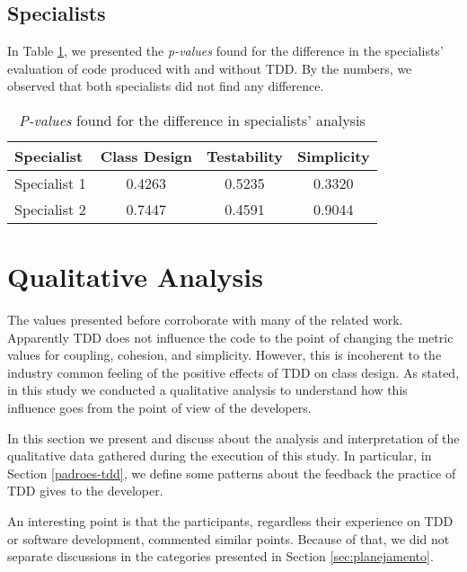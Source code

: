 \documentclass[times]{speauth}
\begin{document}
\subsection{Specialists}

In Table
\ref{tab:especialistas-industria}, we presented the \textit{p-values} found for the
difference in the specialists' evaluation of code produced with and without TDD.
By the numbers, we observed that both specialists did not find any difference.

\begin{table}[h!]
	\centering
	\begin{tabular}{| p{2cm} | c | c | c | }
		\hline
		\textbf{Specialist} & \textbf{Class Design} & \textbf{Testability} & \textbf{Simplicity}\\
		\hline
		Specialist 1 &	0.4263 &	0.5235 &	0.3320\\
		Specialist 2 &	0.7447 &	0.4591 &	0.9044\\
		\hline
	\end{tabular}
	\caption{\textit{P-values} found for the difference in specialists' analysis}
	\label{tab:especialistas-industria}
\end{table}

\section{Qualitative Analysis}

The values presented before corroborate with many of the related work.
Apparently TDD does not influence the code to the point of changing
the metric values for coupling, cohesion, and simplicity. However, this is
incoherent to the industry common feeling of the positive effects of TDD on class design.
As stated, in this study we conducted a qualitative analysis to understand
how this influence goes from the point of view of the developers.

In this section we present and discuss about the analysis and interpretation of
the qualitative data gathered during the execution of this study. In particular,
in Section \ref{padroes-tdd}, we define some patterns about the feedback the practice
of TDD gives to the developer.

An interesting point is that the participants, regardless their experience on TDD or
software development, commented similar points. Because of that, we did not separate
discussions in the categories presented in Section \ref{sec:planejamento}.
\end{document}
